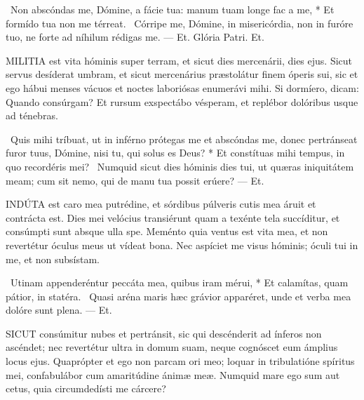 \R\ Non abscóndas me, Dómine, a fácie tua: manum tuam longe fac a me, * Et formído tua non me térreat. \V\ Córripe me, Dómine, in misericórdia, non in furóre tuo, ne forte ad níhilum rédigas me. — Et. Glória Patri. Et.





\lettrine[lines=2]{M}{ILITIA} est vita hóminis super terram, et sicut dies mercenárii, dies ejus. Sicut servus desíderat umbram, et sicut mercenárius præstolátur finem óperis sui, sic et ego hábui menses vácuos et noctes laboriósas enumerávi mihi. Si dormíero, dicam: Quando consúrgam? Et rursum exspectábo vésperam, et replébor dolóribus usque ad ténebras.

\R\ Quis mihi tríbuat, ut in inférno prótegas me et abscóndas me, donec pertránseat furor tuus, Dómine, nisi tu, qui solus es Deus? * Et constítuas mihi tempus, in quo recordéris mei? \V\ Numquid sicut dies hóminis dies tui, ut quæras iniquitátem meam; cum sit nemo, qui de manu tua possit erúere? — Et.


\lettrine[lines=2]{I}{NDÚTA} est caro mea putrédine, et sórdibus púlveris cutis mea áruit et contrácta est. Dies mei velócius transiérunt quam a texénte tela succíditur, et consúmpti sunt absque ulla spe. Meménto quia ventus est vita mea, et non revertétur óculus meus ut vídeat bona. Nec aspíciet me visus hóminis; óculi tui in me, et non subsístam.

\R\ Utinam appenderéntur peccáta mea, quibus iram mérui, * Et calamítas, quam pátior, in statéra. \V\ Quasi aréna maris hæc grávior apparéret, unde et verba mea dolóre sunt plena. — Et.



\lettrine[lines=2]{S}{ICUT} consúmitur nubes et pertránsit, sic qui descénderit ad ínferos non ascéndet; nec revertétur ultra in domum suam, neque cognóscet eum ámplius locus ejus. Quaprópter et ego non parcam ori meo; loquar in tribulatióne spíritus mei, confabulábor cum amaritúdine ánimæ meæ. Numquid mare ego sum aut cetus, quia circumdedísti me cárcere?

